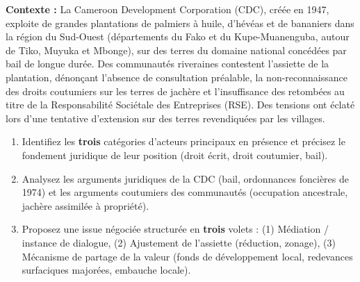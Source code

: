 \documentclass[11pt]{article}
\begin{document}
\begin{exercice}
\textbf{Contexte :} La Cameroon Development Corporation (CDC), créée en 1947, exploite de grandes plantations de palmiers à huile, d'hévéas et de bananiers dans la région du Sud-Ouest (départements du Fako et du Kupe-Muanenguba, autour de Tiko, Muyuka et Mbonge), sur des terres du domaine national concédées par bail de longue durée. Des communautés riveraines contestent l'assiette de la plantation, dénonçant l'absence de consultation préalable, la non-reconnaissance des droits coutumiers sur les terres de jachère et l'insuffisance des retombées au titre de la Responsabilité Sociétale des Entreprises (RSE). Des tensions ont éclaté lors d'une tentative d'extension sur des terres revendiquées par les villages.
\begin{enumerate}
    \item Identifiez les \textbf{trois} catégories d'acteurs principaux en présence et précisez le fondement juridique de leur position (droit écrit, droit coutumier, bail).
    \item Analysez les arguments juridiques de la CDC (bail, ordonnances foncières de 1974) et les arguments coutumiers des communautés (occupation ancestrale, jachère assimilée à propriété).
    \item Proposez une issue négociée structurée en \textbf{trois} volets : (1) Médiation / instance de dialogue, (2) Ajustement de l'assiette (réduction, zonage), (3) Mécanisme de partage de la valeur (fonds de développement local, redevances surfaciques majorées, embauche locale).
\end{enumerate}
\end{exercice}
\end{document}
